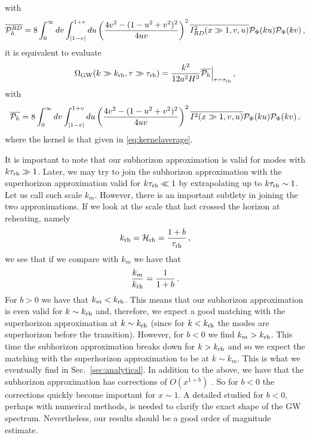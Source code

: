 \documentclass[a4paper,11pt]{article}
\numberwithin{equation}{section}
\begin{document}
with
\begin{equation}\label{eq:PhgaussiansubRD}
\overline{{\cal P}^{RD}_h}=8\int_0^\infty dv\int_{|1-v|}^{1+v}du\left(\frac{4v^2-(1-u^2+v^2)^2}{4uv}\right)^2\overline{I_{RD}^2(x\gg1,v,u)}{{\cal P}_{\Phi}(ku)}{{\cal P}_{\Phi}(kv)}\,,
\end{equation}
it is equivalent to evaluate
\begin{equation}\label{eq:spectraldensitysubRD2}
\Omega_{\rm GW}(k\gg k_{\rm rh}, \tau\gg \tau_{\rm rh})=\frac{k^2}{12a^2H^2}\overline{{\cal P}_{h}}\Big|_{\tau=\tau_{\rm rh}}\,,
\end{equation}
with
\begin{equation}\label{eq:PhgaussiansubRD2}
\overline{{\cal P}_h}=8\int_0^\infty dv\int_{|1-v|}^{1+v}du\left(\frac{4v^2-(1-u^2+v^2)^2}{4uv}\right)^2\overline{I^2(x\gg1,v,u)}{{\cal P}_{\Phi}(ku)}{{\cal P}_{\Phi}(kv)}\,,
\end{equation}
where the kernel is that given in \eqref{eq:kernelaverage}.

It is important to note that our subhorizon approximation is valid for modes with $k\tau_{\rm rh}\gg 1$. Later, we may try to join the subhorizon approximation with the superhorizon approximation valid for $k\tau_{\rm rh}\ll 1$ by extrapolating up to $k\tau_{\rm rh}\sim 1$. Let us call such scale $k_m$. However, there is an important subtlety in joining the two approximations. If we look at the scale that last crossed the horizon at reheating, namely
\begin{align}
k_{\rm rh}={\cal H}_{\rm rh}=\frac{1+b}{\tau_{\rm rh}}\,,
\end{align}
we see that if we compare with $k_m$ we have that
\begin{align}
\frac{k_m}{k_{\rm rh}}=\frac{1}{1+b}\,.
\end{align}
For $b>0$ we have that $k_m<k_{\rm rh}$. This means that our subhorizon approximation is even valid for $k\sim k_{\rm rh}$ and, therefore, we expect a good matching with the superhorizon approximation at $k\sim k_{\rm rh}$ (since for $k<k_{\rm rh}$ the modes are superhorizon before the transition). However, for $b<0$ we find $k_m>k_{\rm rh}$. This time the subhorizon approximation breaks down for $k>k_{\rm rh}$ and so we expect the matching with the superhorizon approximation to be at $k\sim k_m$. This is what we eventually find in Sec.~\ref{sec:analytical}. In addition to the above, we have that the subhorizon approximation has corrections of $O(x^{1+b})$ \cite{Domenech:2020kqm}. So for $b<0$ the corrections quickly become important for $x\sim 1$. A detailed studied for $b<0$, perhaps with numerical methods, is needed to clarify the exact shape of the GW spectrum. Nevertheless, our results should be a good order of magnitude estimate.
\end{document}

